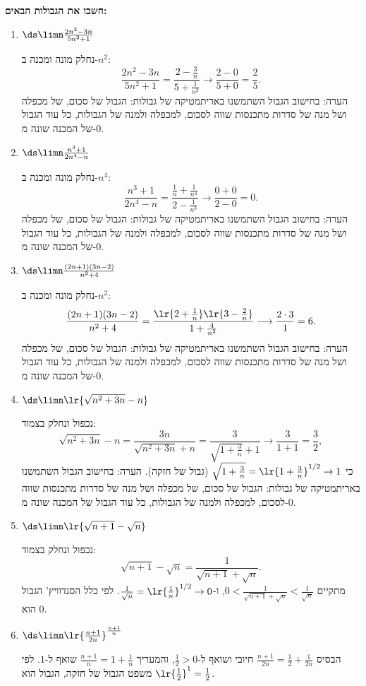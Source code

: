 \textbf{חשבו את הגבולות הבאים:}
\begin{enumerate}
\item $\ds\limn\frac{2n^2-3n}{5n^2+1}$
\begin{solbox}
נחלק מונה ומכנה ב-$n^2$:
$$\frac{2n^2-3n}{5n^2+1}=\frac{2-\frac3n}{5+\frac{1}{n^2}}\longrightarrow\frac{2-0}{5+0}=\frac25 .$$
הערה: בחישוב הגבול השתמשנו באריתמטיקה של גבולות: הגבול של סכום, של מכפלה ושל מנה של סדרות מתכנסות שווה לסכום, למכפלה ולמנה של הגבולות, כל עוד הגבול של המכנה שונה מ-$0$.
\end{solbox}
\item $\ds\limn\frac{n^3+1}{2n^4-n}$
\begin{solbox}
נחלק מונה ומכנה ב-$n^4$:
$$\frac{n^3+1}{2n^4-n}=\frac{\frac1n+\frac{1}{n^4}}{2-\frac{1}{n^3}}\longrightarrow\frac{0+0}{2-0}=0 .$$
הערה: בחישוב הגבול השתמשנו באריתמטיקה של גבולות: הגבול של סכום, של מכפלה ושל מנה של סדרות מתכנסות שווה לסכום, למכפלה ולמנה של הגבולות, כל עוד הגבול של המכנה שונה מ-$0$.
\end{solbox}
\item $\ds\limn\frac{(2n+1)(3n-2)}{n^2+4}$
\begin{solbox}
נחלק מונה ומכנה ב-$n^2$:
$$\frac{(2n+1)(3n-2)}{n^2+4}=\frac{\lr{2+\frac1n}\lr{3-\frac2n}}{1+\frac{4}{n^2}}\longrightarrow\frac{2\cdot3}{1}=6 .$$
הערה: בחישוב הגבול השתמשנו באריתמטיקה של גבולות: הגבול של סכום, של מכפלה ושל מנה של סדרות מתכנסות שווה לסכום, למכפלה ולמנה של הגבולות, כל עוד הגבול של המכנה שונה מ-$0$.
\end{solbox}
\item $\ds\limn\lr{\sqrt{n^2+3n}-n}$
\begin{solbox}
נכפול ונחלק בצמוד:
$$\sqrt{n^2+3n}-n=\frac{3n}{\sqrt{n^2+3n}+n}=\frac{3}{\sqrt{1+\frac3n}+1}\longrightarrow\frac{3}{1+1}=\frac32 ,$$
כי
$\sqrt{1+\frac3n}=\lr{1+\frac3n}^{1/2}\to1$
(גבול של חזקה).
הערה: בחישוב הגבול השתמשנו באריתמטיקה של גבולות: הגבול של סכום, של מכפלה ושל מנה של סדרות מתכנסות שווה לסכום, למכפלה ולמנה של הגבולות, כל עוד הגבול של המכנה שונה מ-$0$.
\end{solbox}
\item $\ds\limn\lr{\sqrt{n+1}-\sqrt n}$
\begin{solbox}
נכפול ונחלק בצמוד:
$$\sqrt{n+1}-\sqrt n=\frac{1}{\sqrt{n+1}+\sqrt n}.$$
מתקיים
$0<\frac{1}{\sqrt{n+1}+\sqrt n}<\frac{1}{\sqrt n}$,
ו-$\frac{1}{\sqrt n}=\lr{\frac1n}^{1/2}\to0$.
לפי כלל הסנדוויץ' הגבול הוא $0$.
\end{solbox}
\item $\ds\limn\lr{\frac{n+1}{2n}}^{\frac{n+1}{n}}$
\begin{solbox}
הבסיס
$\frac{n+1}{2n}=\frac12+\frac{1}{2n}$
חיובי ושואף ל-$\frac12>0$,
והמעריך
$\frac{n+1}{n}=1+\frac1n$
שואף ל-$1$.
לפי משפט הגבול של חזקה, הגבול הוא
$\lr{\frac12}^1=\frac12$.
\end{solbox}
\eMs
\end{enumerate}
